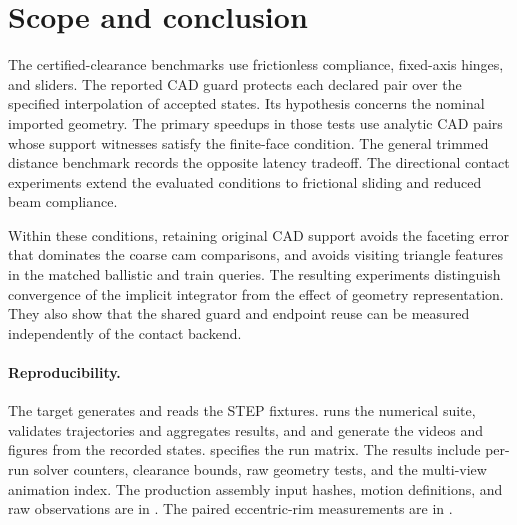 \documentclass[10pt,a4paper]{article}
\begin{document}

\section{Scope and conclusion}

The certified-clearance benchmarks use frictionless compliance, fixed-axis hinges, and sliders. The reported CAD guard protects each declared pair over the specified interpolation of accepted states. Its hypothesis concerns the nominal imported geometry. The primary speedups in those tests use analytic CAD pairs whose support witnesses satisfy the finite-face condition. The general trimmed distance benchmark records the opposite latency tradeoff. The directional contact experiments extend the evaluated conditions to frictional sliding and reduced beam compliance.

Within these conditions, retaining original CAD support avoids the faceting error that dominates the coarse cam comparisons, and avoids visiting triangle features in the matched ballistic and train queries. The resulting experiments distinguish convergence of the implicit integrator from the effect of geometry representation. They also show that the shared guard and endpoint reuse can be measured independently of the contact backend.

\paragraph{Reproducibility.}
The  target generates and reads the STEP fixtures.  runs the numerical suite,  validates trajectories and aggregates results, and  and  generate the videos and figures from the recorded states.  specifies the run matrix. The results include per-run solver counters, clearance bounds, raw geometry tests, and the multi-view animation index. The production assembly input hashes, motion definitions, and raw observations are in . The paired eccentric-rim measurements are in .



\end{document}
